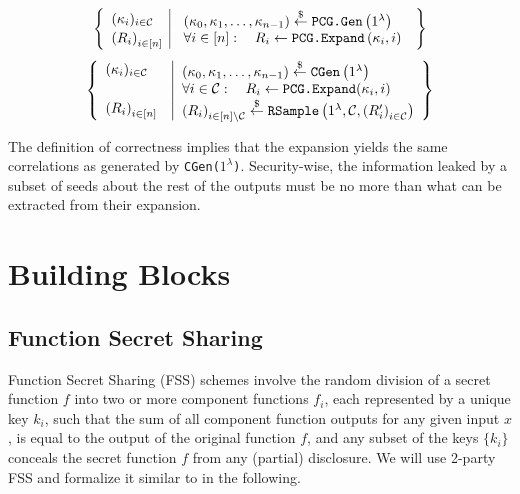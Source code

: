 \begin{definition}
\begin{itemize}
        $$
        \left\{\begin{array}{l|l}
        (\kappa_i)_{i\in\mathcal{C}} & \begin{array}{l}
        \left(\kappa_0, \kappa_1, \ldots, \kappa_{n-1}\right) \stackrel{\$}{\leftarrow} \texttt{\textup{PCG.Gen}}\left(1^\lambda\right) \\
        \end{array} \\
        \left(R_i\right)_{i \in[n]} & \begin{array}{l}
        \forall i \in[n]: \quad R_i \leftarrow \texttt{\textup{PCG.Expand}}\left(\kappa_i, i\right)
        \end{array}
        \end{array}\right\}
        $$
        $$
        \left\{\begin{array}{l}
        (\kappa_i)_{i\in\mathcal{C}} \\\\
        \left(R_i\right)_{i \in[n]} \vphantom{\stackrel{\$}{\leftarrow}}
        \end{array}\right.
        \left|\begin{array}{l}
        \left(\kappa_0, \kappa_1, \ldots, \kappa_{n-1}\right) \stackrel{\$}{\leftarrow} \texttt{\textup{CGen}}\left(1^\lambda\right) \\
        \forall i \in \mathcal{C}: \quad R_i \leftarrow \texttt{\textup{PCG.Expand}}(\kappa_i, i) \\
        \left(R_i\right)_{i \in [n]\setminus\mathcal{C}} \stackrel{\$}{\leftarrow} \texttt{\textup{RSample}}\left(1^\lambda, \mathcal{C},\left(R_i^{\prime}\right)_{i \in \mathcal{C}}\right)
        \end{array}\right\}
        $$
    \end{itemize} 
\end{definition}

The definition of correctness implies that the expansion yields the same correlations as generated by \texttt{\textup{CGen($1^\lambda$)}}. Security-wise, the information leaked by a subset of seeds about the rest of the outputs must be no more than what can be extracted from their expansion.


\section{Building Blocks}
\subsection{Function Secret Sharing}
\label{prelim:FSS}
Function Secret Sharing \cite{boyle2015function} (FSS) schemes involve the random division of a secret function \(f\) into two or more component functions \(f_i\), each represented by a unique key \(k_i\), such that the sum of all component function outputs for any given input \(x\), is equal to the output of the original function \(f\), and any subset of the keys \(\{k_i\}\) conceals the secret function \(f\) from any (partial) disclosure. We will use 2-party FSS and formalize it similar to \cite{boyle2020efficient} in the following.


